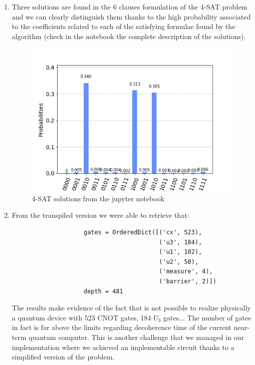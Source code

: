 \documentclass[english]{article}
\begin{document}
				\begin{enumerate}
					\item Three solutions are found in the 6 clauses formulation of the 4-SAT problem and we can clearly distinguish them thanks to the high probability associated to the coefficients related to each of the satisfying formulae found by the algorithm (check in the notebook the complete description of the solutions).
					\begin{figure}[h]
						\centering
						\includegraphics[scale=0.5]{NotebookHistogram}
						\caption{4-SAT solutions from the jupyter notebook}
					\end{figure}
				
					\item From the transpiled version we were able to retrieve that:
					\begin{verbatim}
					gates = OrderedDict([('cx', 523), 
					                     ('u3', 184), 
					                     ('u1', 102), 
					                     ('u2', 50), 
					                     ('measure', 4), 
					                     ('barrier', 2)])
					depth = 481
					\end{verbatim}
					The results make evidence of the fact that is not possible to realize physically a quantum device with 523 CNOT gates, 184 $U_3$ gates... The number of gates in fact is far above the limits regarding decoherence time of the current near-term quantum computer. This is another challenge that we managed in our implementation where we achieved an implementable circuit thanks to a simplified version of the problem.
				\end{enumerate} 
		
\end{document}
